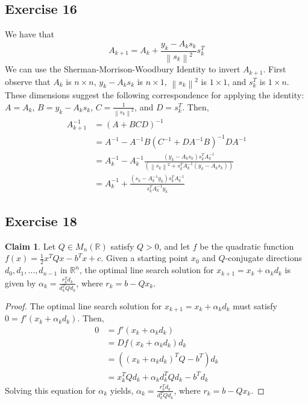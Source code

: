 \documentclass[letterpaper,12pt]{article}
\theoremstyle{definition}
\newtheorem{claim}[theorem]{Claim}
\newcommand{\norm}[1]{\left\lVert#1\right\rVert}
\begin{document}
\subsection*{Exercise 16}
We have that 
\begin{equation}
A_{k+1} = A_k + \frac{y_k - A_k s_k}{\norm{s_k}^2} s^T_k
\end{equation}
We can use the Sherman-Morrison-Woodbury Identity to invert $A_{k+1}$. First observe that $A_k$ is $n\times n$, $y_k - A_k s_k$ is $n \times 1$, $\norm{s_k}^2$ is $1\times 1$, and $s^T_k$ is $1 \times n$. These dimensions suggest the following correspondence for applying the identity: $A = A_k$, $B = y_k - A_k s_k$, $C = \frac{1}{\norm{s_k}^2}$, and $D = s^T_k$. 
Then,
\begin{align*}
	A_{k+1}^{-1} &= (A + BCD)^{-1} \\
	&= A^{-1} - A^{-1} B (C^{-1} + DA^{-1}B)^{-1} D A^{-1} \\
	&= A_k^{-1} - A_k^{-1} \frac{(y_k - A_k s_k)s^T_k A^{-1}_k}{(\norm{s_k}^2 + s^T_k A^{-1}_k (y_k - A_k s_k))} \\
	&= A_k^{-1} + \frac{(s_k - A^{-1}_k y_k)s^T_kA^{-1}_k}{s^T_k A^{-1}_k y_k }
\end{align*}	

\subsection*{Exercise 18}
\begin{claim}
Let $Q \in M_n(\mathbb{R})$ satisfy $Q > 0$, and let $f$ be the quadratic function $f(x) = \frac{1}{2}x^TQx - b^Tx + c$. Given a starting point $x_0$ and $Q$-conjugate directions $d_0, d_1, \ldots, d_{n-1}$ in $\mathbb{R}^n$, the optimal line search solution for $x_{k+1} = x_k + \alpha_k d_k$ is given by $\alpha_k = \frac{r^T_k d_k}{d^T_k Q d_k}$, where $r_k = b- Qx_k$. 
\end{claim}
\begin{proof}
	The optimal line search solution for $x_{k+1} = x_k + \alpha_k d_k$ must satisfy $0 = f'(x_k + \alpha_k d_k)$. Then,
	\begin{align*}
	0 &= f'(x_k + \alpha_k d_k) \\
	&= Df(x_k + \alpha_k d_k) d_k \\
	&= ((x_k + \alpha_k d_k)^T Q - b^T)d_k \\
	&= x_k^T Q d_k + \alpha_k  d_k^T Q d_k - b^T d_k 
	\end{align*}
	Solving this equation for $\alpha_k$ yields, $\alpha_k = \frac{r^T_k d_k}{d^T_k Q d_k}$, where $r_k = b- Qx_k$. 
\end{proof}
\end{document}
